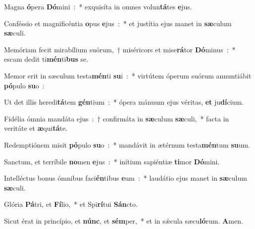 ﻿\item Magna \textbf{ó}\-pera \textbf{Dó}\-mini~:~* exquisíta in omnes vo\-lun\-\textbf{tá}\-tes \textbf{e}jus.
\item Conféssio et magnificéntia \textbf{o}\-pus \textbf{e}jus~:~* et justítia ejus manet in \textbf{sæ}\-culum \textbf{sæ}culi.
\item Memóriam fecit mi\-ra\-bí\-li\-um suórum,~† miséricors et mise\textbf{rá}\-tor \textbf{Dó}\-minus~:~* escam dedit ti\textbf{mén}\-ti\textbf{bus} se.
\item Memor erit in sæculum testa\textbf{mén}\-ti \textbf{su}\-i~:~* virtútem óperum suórum annuntiábit \textbf{pó}\-pulo \textbf{su}o~:
\item Ut det illis heredi\textbf{tá}\-tem \textbf{gén}\-tium~:~* ópera mánuum ejus véritas, \textbf{et} ju\textbf{dí}cium.
\item Fidélia ómnia mandáta ejus~:~† confirmáta in \textbf{sæ}\-cu\-lum \textbf{sæ}\-culi,~* facta in veritáte et \textbf{æ}qui\textbf{tá}te.
\item Redemptiónem misit \textbf{pó}\-pulo \textbf{su}\-o~:~* mandávit in ætérnum testa\textbf{mén}\-tum \textbf{su}um.
\item Sanctum, et terríbile \textbf{no}\-men \textbf{e}jus~:~* inítium sapiéntiæ \textbf{ti}\-mor \textbf{Dó}mini.
\item Intelléctus bonus ómnibus faci\textbf{én}\-tibus \textbf{e}\-um~:~* laudátio ejus manet in \textbf{sæ}\-culum \textbf{sæ}culi.
\item Glória \textbf{Pá}\-tri, et \textbf{Fí}\-lio,~* et Spi\textbf{rí}\-tui \textbf{Sán}cto.
\item Sicut érat in princípio, et \textbf{núnc}, et \textbf{sém}\-per,~* et in sǽcula sæcu\textbf{ló}\-rum. \textbf{A}men.